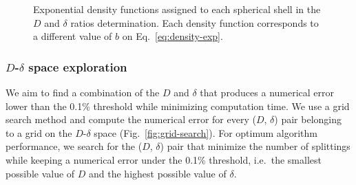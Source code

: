\documentclass[extra, referee]{gji}
\begin{document}
\begin{figure}
\centering
{}
\caption{
    Exponential density functions assigned to each spherical shell in the $D$ and
    $\delta$ ratios determination.
    Each density function corresponds to a different value of $b$ on
    Eq.~\ref{eq:density-exp}.
}
\label{fig:exp-densities}
\end{figure}


\subsubsection{$D$-$\delta$ space exploration}

We aim to find a combination of the $D$ and $\delta$ that produces a numerical error
lower than the 0.1\% threshold while minimizing computation time.
We use a grid search method and compute the numerical error for every ($D$, $\delta$)
pair belonging to a grid on the $D$-$\delta$ space (Fig.~\ref{fig:grid-search}).
For optimum algorithm performance, we search for the ($D$, $\delta$) pair that minimize
the number of splittings while keeping a numerical error under the 0.1\% threshold,
i.e.~the smallest possible value of $D$ and the highest possible value of $\delta$.
\end{document}
